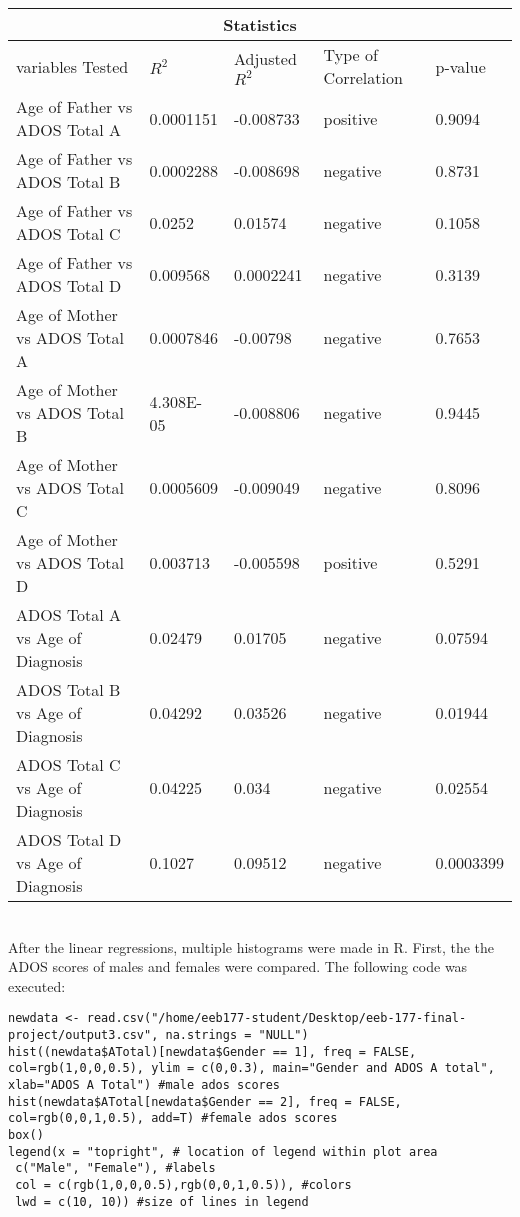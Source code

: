 \documentclass{article}
\begin{document}
\begin{tabular}{ |p{4cm}|p{2cm}|p{2cm}|p{2cm}|p{2cm}| }
 \hline
 \multicolumn{5}{|c|}{Statistics} \\
 \hline
variables Tested & $R^2$ & Adjusted $R^2$ & Type of Correlation & p-value\\
 \hline
Age of Father vs ADOS Total A &	0.0001151&	-0.008733&	positive&	0.9094\\
Age of Father vs ADOS Total B&	0.0002288&	-0.008698&	negative&	0.8731\\
Age of Father vs ADOS Total C&	0.0252&	0.01574&	negative&	0.1058\\
Age of Father vs ADOS Total D&	0.009568&	0.0002241&	negative&	0.3139\\
Age of Mother vs ADOS Total A&	0.0007846&	-0.00798&	negative&	0.7653\\
Age of Mother vs ADOS Total B&	4.308E-05&	-0.008806&	negative&	0.9445\\
Age of Mother vs ADOS Total C&	0.0005609&	-0.009049&	negative&	0.8096\\
Age of Mother vs ADOS Total D&	0.003713&	-0.005598&	positive&	0.5291\\
ADOS Total A vs Age of Diagnosis&	0.02479&	0.01705&	negative&	0.07594\\
ADOS Total B vs Age of Diagnosis&	0.04292&	0.03526	&negative&	0.01944\\
ADOS Total C vs Age of Diagnosis&	0.04225	&0.034&	negative&	0.02554\\
ADOS Total D vs Age of Diagnosis&	0.1027&	0.09512&	negative&	0.0003399\\
 \hline
\end{tabular}\\

After the linear regressions, multiple histograms were made in R. First, the the ADOS scores of males and females were compared. The following code was executed:
\begin{verbatim}
newdata <- read.csv("/home/eeb177-student/Desktop/eeb-177-final-project/output3.csv", na.strings = "NULL")
hist((newdata$ATotal)[newdata$Gender == 1], freq = FALSE, col=rgb(1,0,0,0.5), ylim = c(0,0.3), main="Gender and ADOS A total", xlab="ADOS A Total") #male ados scores
hist(newdata$ATotal[newdata$Gender == 2], freq = FALSE, col=rgb(0,0,1,0.5), add=T) #female ados scores
box() 
legend(x = "topright", # location of legend within plot area
 c("Male", "Female"), #labels
 col = c(rgb(1,0,0,0.5),rgb(0,0,1,0.5)), #colors
 lwd = c(10, 10)) #size of lines in legend
\end{verbatim}
\end{document}
